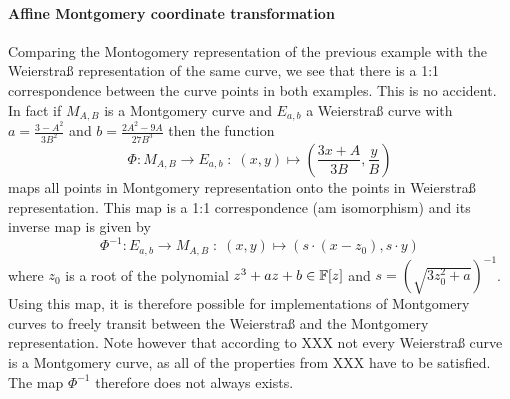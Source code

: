 \paragraph{Affine Montgomery coordinate transformation} Comparing the Montogomery representation of the previous example with the Weierstraß representation of the same curve, we see that there is a 1:1 correspondence between the curve points in both examples. This is no accident. In fact if $M_{A,B}$ is a Montgomery curve and $E_{a,b}$ a Weierstraß curve with $a = \frac{3-A^2}{3B^2}$ and $b= \frac{2A^2 -9A}{27B^3}$ then the function
\begin{equation}
\Phi: M_{A,B} \to E_{a,b}\; : \; (x,y) \mapsto \left(\frac{3x + A}{3B}, \frac{y}{B}\right)
\end{equation}
maps all points in Montgomery representation onto the points in Weierstraß representation. This map is a 1:1 correspondence (am isomorphism) and its inverse map is given by
\begin{equation}
\Phi^{-1}: E_{a,b} \to M_{A,B}\; : \; (x,y) \mapsto \left(s\cdot(x-z_0), s\cdot y\right)
\end{equation}
where $z_0$ is a root of the polynomial $z^3 + a z + b \in \mathbb{F}[z]$ and $s=({\sqrt{3z_0^{2}+a}})^{-1}$. Using this map, it is therefore possible for implementations of Montgomery curves to freely transit between the Weierstraß and the Montgomery representation. Note however that according to XXX not every Weierstraß curve is a Montgomery curve, as all of the properties from XXX have to be satisfied. The map $\Phi^{-1}$ therefore does not always exists.

